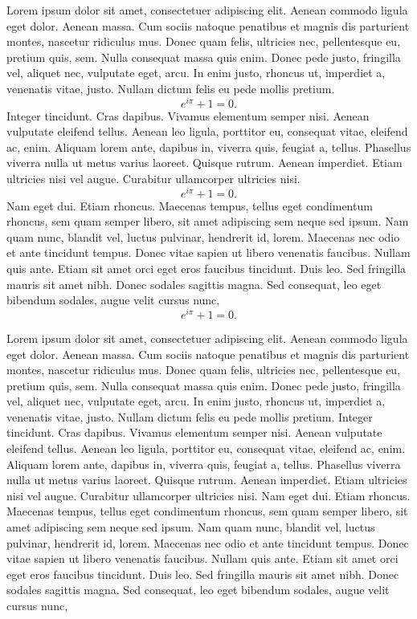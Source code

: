 \documentclass[a4paper,11pt,spanish, twoside, leqno]{tfg-uam}
\theoremstyle{definition}
\begin{document}
Lorem ipsum dolor sit amet, consectetuer adipiscing elit. Aenean commodo ligula eget dolor. Aenean massa. Cum sociis natoque penatibus et magnis dis parturient montes, nascetur ridiculus mus. Donec quam felis, ultricies nec, pellentesque eu, pretium quis, sem. Nulla consequat massa quis enim. Donec pede justo, fringilla vel, aliquet nec, vulputate eget, arcu. In enim justo, rhoncus ut, imperdiet a, venenatis vitae, justo. Nullam dictum felis eu pede mollis pretium.
\begin{equation}
e^{i\pi }+1=0.
\end{equation}
Integer tincidunt. Cras dapibus. Vivamus elementum semper nisi. Aenean vulputate eleifend tellus. Aenean leo ligula, porttitor eu, consequat vitae, eleifend ac, enim. Aliquam lorem ante, dapibus in, viverra quis, feugiat a, tellus. Phasellus viverra nulla ut metus varius laoreet. Quisque rutrum. Aenean imperdiet. Etiam ultricies nisi vel augue. Curabitur ullamcorper ultricies nisi.
\begin{equation}
e^{i\pi }+1=0.
\end{equation}
Nam eget dui. Etiam rhoncus. Maecenas tempus, tellus eget condimentum rhoncus, sem quam semper libero, sit amet adipiscing sem neque sed ipsum. Nam quam nunc, blandit vel, luctus pulvinar, hendrerit id, lorem. Maecenas nec odio et ante tincidunt tempus. Donec vitae sapien ut libero venenatis faucibus. Nullam quis ante. Etiam sit amet orci eget eros faucibus tincidunt. Duis leo. Sed fringilla mauris sit amet nibh. Donec sodales sagittis magna. Sed consequat, leo eget bibendum sodales, augue velit cursus nunc,
$$
e^{i\pi }+1=0.
$$

Lorem ipsum dolor sit amet, consectetuer adipiscing elit. Aenean commodo ligula eget dolor. Aenean massa. Cum sociis natoque penatibus et magnis dis parturient montes, nascetur ridiculus mus. Donec quam felis, ultricies nec, pellentesque eu, pretium quis, sem. Nulla consequat massa quis enim. Donec pede justo, fringilla vel, aliquet nec, vulputate eget, arcu. In enim justo, rhoncus ut, imperdiet a, venenatis vitae, justo. Nullam dictum felis eu pede mollis pretium. Integer tincidunt. Cras dapibus. Vivamus elementum semper nisi. Aenean vulputate eleifend tellus. Aenean leo ligula, porttitor eu, consequat vitae, eleifend ac, enim. Aliquam lorem ante, dapibus in, viverra quis, feugiat a, tellus. Phasellus viverra nulla ut metus varius laoreet. Quisque rutrum. Aenean imperdiet. Etiam ultricies nisi vel augue. Curabitur ullamcorper ultricies nisi. Nam eget dui. Etiam rhoncus. Maecenas tempus, tellus eget condimentum rhoncus, sem quam semper libero, sit amet adipiscing sem neque sed ipsum. Nam quam nunc, blandit vel, luctus pulvinar, hendrerit id, lorem. Maecenas nec odio et ante tincidunt tempus. Donec vitae sapien ut libero venenatis faucibus. Nullam quis ante. Etiam sit amet orci eget eros faucibus tincidunt. Duis leo. Sed fringilla mauris sit amet nibh. Donec sodales sagittis magna. Sed consequat, leo eget bibendum sodales, augue velit cursus nunc,
\end{document}
